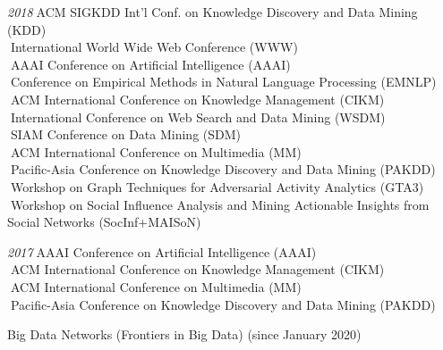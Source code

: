 \documentclass[10pt]{article}
\newenvironment{myindentpar}[1]%
{\begin{list}{}%
         {\setlength{\leftmargin}{#1}}%
         \item[]%
}
{\end{list}}
\newcounter{list}
\begin{document}
\begin{myindentpar}{0.75cm}
{\hspace{-0.75cm}\emph{2018}\textcolor{white}{.}ACM SIGKDD Int'l Conf. on Knowledge Discovery and Data Mining (KDD) \\
\textcolor{white}{.}International World Wide Web Conference (WWW) \\
\textcolor{white}{.}AAAI Conference on Artificial Intelligence (AAAI) \\
\textcolor{white}{.}Conference on Empirical Methods in Natural Language Processing (EMNLP) \\
\textcolor{white}{.}ACM International Conference on Knowledge Management (CIKM) \\
\textcolor{white}{.}International Conference on Web Search and Data Mining (WSDM) \\
\textcolor{white}{.}SIAM Conference on Data Mining (SDM) \\
\textcolor{white}{.}ACM International Conference on Multimedia (MM) \\
\textcolor{white}{.}Pacific-Asia Conference on Knowledge Discovery and Data Mining (PAKDD) \\
\textcolor{white}{.}Workshop on Graph Techniques for Adversarial Activity Analytics (GTA3) \\
\textcolor{white}{.}Workshop on Social Influence Analysis and Mining Actionable Insights from Social Networks (SocInf+MAISoN)

\hspace{-0.75cm}\emph{2017}\textcolor{white}{.}AAAI Conference on Artificial Intelligence (AAAI) \\
\textcolor{white}{.}ACM International Conference on Knowledge Management (CIKM) \\
\textcolor{white}{.}ACM International Conference on Multimedia (MM) \\
\textcolor{white}{.}Pacific-Asia Conference on Knowledge Discovery and Data Mining (PAKDD)

}

\hspace{-0.75cm}{\bf Associate Editor}

{\small

Big Data Networks (Frontiers in Big Data) (since January 2020)

}

\hspace{-0.75cm}{\bf Journal Reviewer}

{\small

}
\end{myindentpar}
\end{document}
